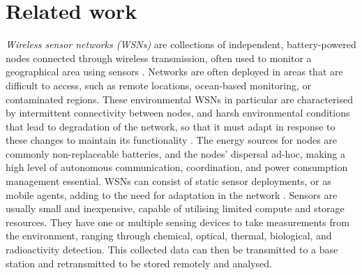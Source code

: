\section{Related work}
\label{section:background}

\textit{Wireless sensor networks (WSNs)} are collections of independent, battery-powered nodes connected through wireless transmission, often used to monitor a geographical area using sensors \citep{Akyildiz,Yick2008a}. Networks are often deployed in areas that are difficult to access, such as remote locations, ocean-based monitoring, or contaminated regions. These environmental WSNs in particular are characterised by intermittent connectivity between nodes, and harsh environmental conditions that lead to degradation of the network, so that it must adapt in response to these changes to maintain its functionality \citep{Oliveira2011}. The energy sources for nodes are commonly non-replaceable batteries, and the nodes' dispersal ad-hoc, making a high level of autonomous communication, coordination, and power consumption management essential. WSNs can consist of static sensor deployments, or as mobile agents, adding to the need for adaptation in the network \citep{ramasamy2017mobile, 4224091}. Sensors are usually small and inexpensive, capable of utilising limited compute and storage resources. They have one or multiple sensing devices to take measurements from the environment, ranging through chemical, optical, thermal, biological, and radioactivity detection. This collected data can then be transmitted to a base station and retransmitted to be stored remotely and analysed.

